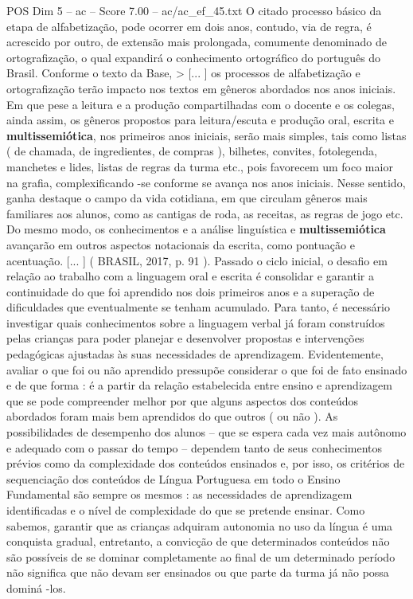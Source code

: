 \begin{textsample}{POS Dim 5 – ac – Score 7.00 – ac/ac\_ef\_45.txt}
O citado processo básico da etapa de alfabetização, pode ocorrer em dois anos, contudo, via de regra, é acrescido por outro, de extensão mais prolongada, comumente denominado de ortografização, o qual expandirá o conhecimento ortográfico do português do Brasil.
Conforme o texto da Base, > [... ] os processos de alfabetização e ortografização terão impacto nos textos em gêneros abordados nos anos iniciais.
Em que pese a leitura e a produção compartilhadas com o docente e os colegas, ainda assim, os gêneros propostos para leitura/escuta e produção oral, escrita e \textbf{multissemiótica}, nos primeiros anos iniciais, serão mais simples, tais como listas ( de chamada, de ingredientes, de compras ), bilhetes, convites, fotolegenda, manchetes e lides, listas de regras da turma etc., pois favorecem um foco maior na grafia, complexificando -se conforme se avança nos anos iniciais.
Nesse sentido, ganha destaque o campo da vida cotidiana, em que circulam gêneros mais familiares aos alunos, como as cantigas de roda, as receitas, as regras de jogo etc.
Do mesmo modo, os conhecimentos e a análise linguística e \textbf{multissemiótica} avançarão em outros aspectos notacionais da escrita, como pontuação e acentuação. [... ] ( BRASIL, 2017, p. 91 ).
Passado o ciclo inicial, o desafio em relação ao trabalho com a linguagem oral e escrita é consolidar e garantir a continuidade do que foi aprendido nos dois primeiros anos e a superação de dificuldades que eventualmente se tenham acumulado.
Para tanto, é necessário investigar quais conhecimentos sobre a linguagem verbal já foram construídos pelas crianças para poder planejar e desenvolver propostas e intervenções pedagógicas ajustadas às suas necessidades de aprendizagem.
Evidentemente, avaliar o que foi ou não aprendido pressupõe considerar o que foi de fato ensinado e de que forma : é a partir da relação estabelecida entre ensino e aprendizagem que se pode compreender melhor por que alguns aspectos dos conteúdos abordados foram mais bem aprendidos do que outros ( ou não ).
As possibilidades de desempenho dos alunos – que se espera cada vez mais autônomo e adequado com o passar do tempo – dependem tanto de seus conhecimentos prévios como da complexidade dos conteúdos ensinados e, por isso, os critérios de sequenciação dos conteúdos de Língua Portuguesa em todo o Ensino Fundamental são sempre os mesmos : as necessidades de aprendizagem identificadas e o nível de complexidade do que se pretende ensinar.
Como sabemos, garantir que as crianças adquiram autonomia no uso da língua é uma conquista gradual, entretanto, a convicção de que determinados conteúdos não são possíveis de se dominar completamente ao final de um determinado período não significa que não devam ser ensinados ou que parte da turma já não possa dominá -los.

\end{textsample}
